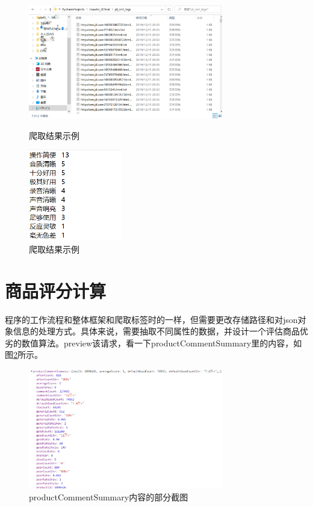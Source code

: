 \begin{figure}[htbp]
\centering
\begin{minipage}[t]{0.48\textwidth}
\centering
\includegraphics[height=5cm]{img/yhb/folder_view_jd.png}
\caption{爬取结果示例}
\label{img:yhb8}  
\end{minipage}
\begin{minipage}[t]{0.48\textwidth}
\centering
\includegraphics[height=4cm]{img/yhb/contents_eg_jd.png}
\caption{爬取结果示例}
\label{img:yhb9}  
\end{minipage}
\end{figure}   %


\section{商品评分计算}
程序的工作流程和整体框架和爬取标签时的一样，但需要更改存储路径和对json对象信息的处理方式。具体来说，需要抽取不同属性的数据，并设计一个评估商品优劣的数值算法。preview该请求，看一下productCommentSummary里的内容，如图\ref{img:yhb10}所示。

\begin{figure}[htbp]
\centering
\includegraphics[width=8.5cm]{img/yhb/data_eg_jd.png}
\caption{productCommentSummary内容的部分截图}
\label{img:yhb10}  %
\end{figure}

